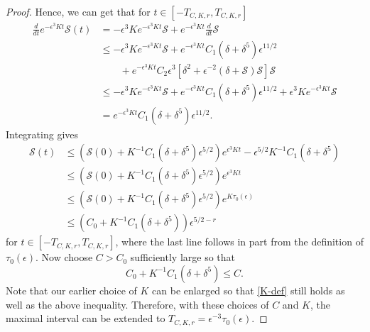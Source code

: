 \begin{proof}
	Hence, we can get that for \(t \in [-T_{C,K,r}, T_{C,K,r}]\) 
	\begin{equation}
	\begin{aligned}
		\frac d {dt} e^{-\epsilon^3 K t} \mathcal S(t) &= - \epsilon^3 K e^{-\epsilon^3 K t} \mathcal S  + e^{-\epsilon^3 K t} \frac d {dt} \mathcal S \\
		&\leq - \epsilon^3 K e^{-\epsilon^3 K t} \mathcal S  + e^{-\epsilon^3 K t}C_1(\delta + \delta^5) \epsilon^{11/2} \\
		&\qquad+ e^{-\epsilon^3 K t}C_2 \epsilon^3\left[ \delta^2 + \epsilon^{-2}(\delta + \mathcal S) \mathcal S \right]\mathcal S \\
		&\leq - \epsilon^3 K e^{-\epsilon^3 K t} \mathcal S  +  e^{-\epsilon^3 K t}C_1(\delta + \delta^5) \epsilon^{11/2} + \epsilon^3 K e^{-\epsilon^3 K t}\mathcal S \\
		&= e^{-\epsilon^3 K t}C_1(\delta + \delta^5) \epsilon^{11/2}.
	\end{aligned}
	\end{equation}
	Integrating gives
	\begin{equation} 
	\begin{aligned}
		\mathcal S(t) &\leq \left( \mathcal S(0) + K^{-1} C_1 (\delta+\delta^5) \epsilon^{5/2} \right) e^{\epsilon^3 K t} - \epsilon^{5/2} K^{-1} C_1 (\delta + \delta^5) \\
		&\leq \left( \mathcal S(0) + K^{-1} C_1 (\delta+\delta^5) \epsilon^{5/2} \right) e^{\epsilon^3 K t} \\
		&\leq \left( \mathcal S(0) + K^{-1} C_1 (\delta+\delta^5) \epsilon^{5/2} \right) e^{ K \tau_0(\epsilon)} \\
		&\leq \left( C_0 + K^{-1} C_1 (\delta+\delta^5)  \right) \epsilon^{5/2 -r}
	\end{aligned}
	\end{equation}
	for \(t \in [-T_{C,K,r}, T_{C,K,r}]\), where the last line follows in part from the definition of \(\tau_0(\epsilon)\). Now choose \(C> C_0\) sufficiently large so that 
	\begin{equation}
		C_0 + K^{-1} C_1(\delta + \delta^5) \leq C.
	\end{equation}
	Note that our earlier choice of \(K\) can be enlarged so that \cref{K-def} still holds as well as the above inequality. Therefore, with these choices of \(C\) and \(K\), the maximal interval can be extended to \(T_{C,K,r} = \epsilon^{-3} \tau_0(\epsilon) \). 
\end{proof}